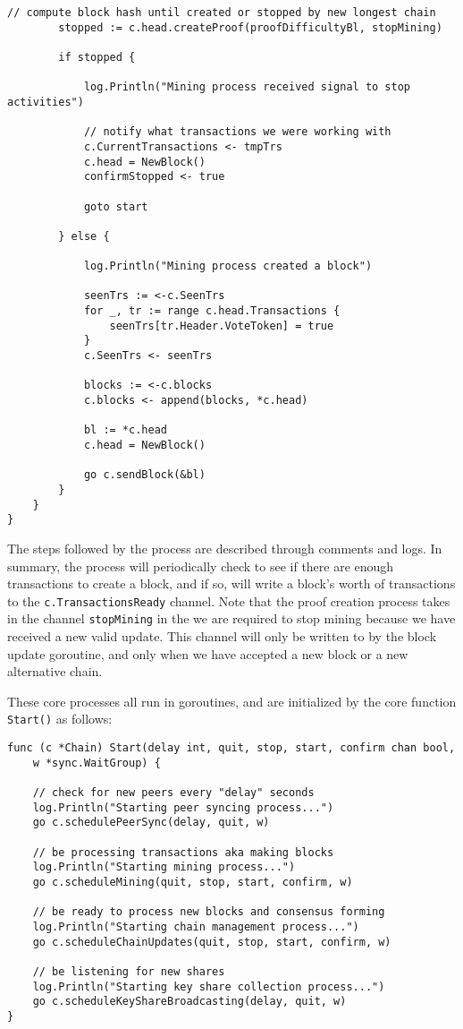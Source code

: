 \documentclass[a4paper,12pt]{article}
\begin{document}
\begin{Verbatim}[obeytabs,tabsize=4]
        // compute block hash until created or stopped by new longest chain
        stopped := c.head.createProof(proofDifficultyBl, stopMining)

        if stopped {

            log.Println("Mining process received signal to stop activities")

            // notify what transactions we were working with
            c.CurrentTransactions <- tmpTrs
            c.head = NewBlock()
            confirmStopped <- true

            goto start

        } else {

            log.Println("Mining process created a block")

            seenTrs := <-c.SeenTrs
            for _, tr := range c.head.Transactions {
                seenTrs[tr.Header.VoteToken] = true
            }
            c.SeenTrs <- seenTrs

            blocks := <-c.blocks
            c.blocks <- append(blocks, *c.head)

            bl := *c.head
            c.head = NewBlock()

            go c.sendBlock(&bl)
        }
    }
}
\end{Verbatim}

The steps followed by the process are described through comments and logs. In summary, the process will periodically check to see if there are enough transactions to create a block, and if so, will write a block's worth of transactions to the \verb|c.TransactionsReady| channel. Note that the proof creation process takes in the channel \verb|stopMining| in the we are required to stop mining because we have received a new valid update. This channel will only be written to by the block update goroutine, and only when we have accepted a new block or a new alternative chain.

These core processes all run in goroutines, and are initialized by the core function \verb|Start()| as follows:

\begin{Verbatim}[obeytabs,tabsize=4]
func (c *Chain) Start(delay int, quit, stop, start, confirm chan bool,
    w *sync.WaitGroup) {

	// check for new peers every "delay" seconds
	log.Println("Starting peer syncing process...")
	go c.schedulePeerSync(delay, quit, w)

	// be processing transactions aka making blocks
	log.Println("Starting mining process...")
	go c.scheduleMining(quit, stop, start, confirm, w)

	// be ready to process new blocks and consensus forming
	log.Println("Starting chain management process...")
	go c.scheduleChainUpdates(quit, stop, start, confirm, w)

	// be listening for new shares
	log.Println("Starting key share collection process...")
	go c.scheduleKeyShareBroadcasting(delay, quit, w)
}
\end{Verbatim}
\end{document}
